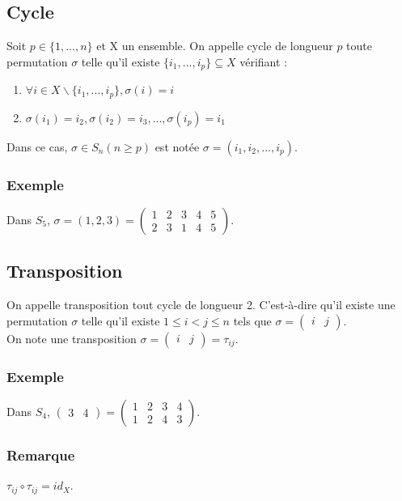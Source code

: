 \documentclass[a4paper,10pt]{book} %
\begin{document}
\subsection{Cycle}
Soit $p\in \{1,...,n\}$ et X un ensemble. On appelle cycle de longueur $p$ toute permutation $\sigma$ telle qu'il existe $\{i_1,...,i_p\}\subseteq X$ vérifiant :
\begin{enumerate}
\item $\forall i\in X\backslash\{i_1,...,i_p\}, \sigma(i)=i$
\item $\sigma(i_1)=i_2,\sigma(i_2)=i_3,...,\sigma(i_p)=i_1$
\end{enumerate}

Dans ce cas, $\sigma\in S_{n} (n\geq p)$ est notée $\sigma=(i_1,i_2,...,i_p)$.

\subsubsection{Exemple}
Dans $S_5$, $\sigma=(1,2,3)=\begin{pmatrix}
1 & 2&3&4&5\\2&3&1&4&5
\end{pmatrix}$.

\subsection{Transposition}
On appelle transposition tout cycle de longueur 2.
C'est-à-dire qu'il existe une permutation $\sigma$ telle qu'il existe $1\leq i< j\leq n$ tels que $\sigma=\begin{pmatrix}i&j\end{pmatrix}$.\\

On note une transposition $\sigma=\begin{pmatrix}i&j\end{pmatrix}=\tau_{ij}$.

\subsubsection{Exemple}
Dans $S_4$, $\begin{pmatrix}3&4\end{pmatrix}=\begin{pmatrix}
1&2&3&4\\1&2&4&3
\end{pmatrix}$.

\subsubsection{Remarque}
$\tau_{ij}\circ \tau_{ij}=id_X$.
\end{document}
